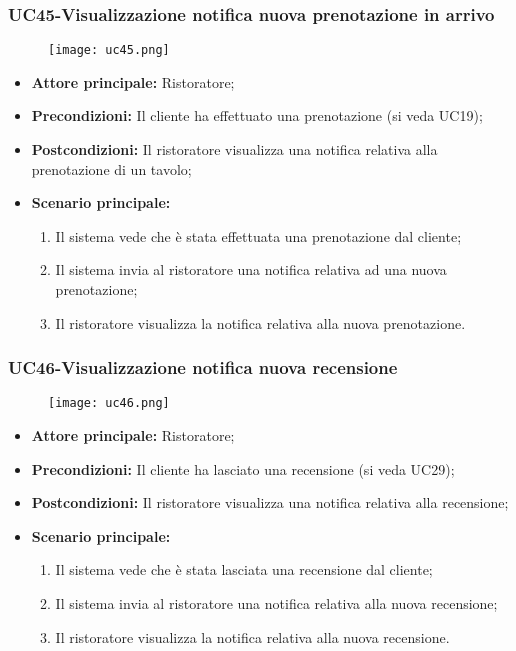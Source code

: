 \pagebreak
\subsubsection{UC45-Visualizzazione notifica nuova prenotazione in arrivo}
\begin{figure}[h] \texttt{[image: uc45.png]} \end{figure}
\begin{itemize}
\item \textbf{Attore principale:} Ristoratore;
\item \textbf{Precondizioni:} Il cliente ha effettuato una prenotazione (si veda UC19);
\item \textbf{Postcondizioni:} Il ristoratore visualizza una notifica relativa alla prenotazione di un tavolo;
\item \textbf{Scenario principale:}
\begin{enumerate}
    \item Il sistema vede che è stata effettuata una prenotazione dal cliente;
    \item Il sistema invia al ristoratore una notifica relativa ad una nuova prenotazione;
    \item Il ristoratore visualizza la notifica relativa alla nuova prenotazione.
\end{enumerate}
\end{itemize}

\subsubsection{UC46-Visualizzazione notifica nuova recensione}
\begin{figure}[h] \texttt{[image: uc46.png]} \end{figure}
\begin{itemize}
\item \textbf{Attore principale:} Ristoratore;
\item \textbf{Precondizioni:} Il cliente ha lasciato una recensione (si veda UC29);
\item \textbf{Postcondizioni:} Il ristoratore visualizza una notifica relativa alla recensione;
\item \textbf{Scenario principale:}
\begin{enumerate}
    \item Il sistema vede che è stata lasciata una recensione dal cliente;
    \item Il sistema invia al ristoratore una notifica relativa alla nuova recensione;
    \item Il ristoratore visualizza la notifica relativa alla nuova recensione.
\end{enumerate}
\end{itemize}

